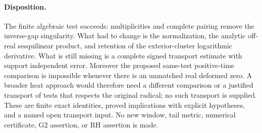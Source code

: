 \paragraph{Disposition.}
The finite algebraic test succeeds: multiplicities and complete
pairing remove the inverse-gap singularity. What had to change is
the normalization, the analytic off-real sesquilinear product, and
retention of the exterior-cluster logarithmic derivative. What is
still missing is a complete signed transport estimate with support
independent error. Moreover the proposed same-test positive-time
comparison is impossible whenever there is an unmatched real
deformed zero. A broader heat approach would therefore need a
different comparison or a justified transport of tests that respects
the original radical; no such transport is supplied. These are
finite exact identities, proved implications with explicit hypotheses,
and a named open transport input. No new window, tail metric,
numerical certificate, G2 assertion, or RH assertion is made.
